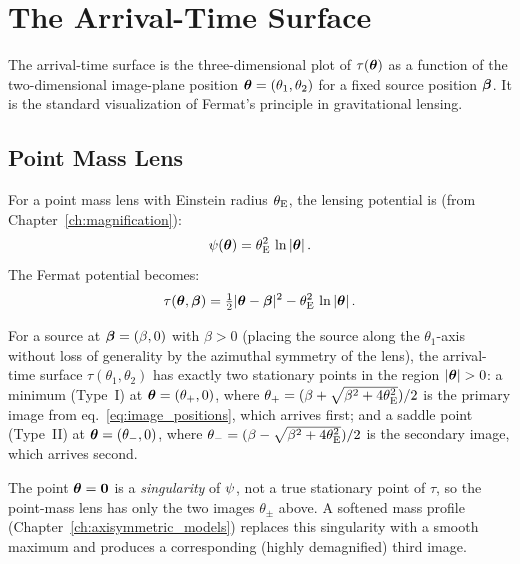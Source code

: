\section{The Arrival-Time Surface}
\label{sec:arrival_time_surface}

The arrival-time surface is the three-dimensional plot of
$\tau(\boldsymbol{\theta})$ as a function of the two-dimensional image-plane
position $\boldsymbol{\theta} = (\theta_1, \theta_2)$ for a fixed source position
$\boldsymbol{\beta}$.  It is the standard visualization of Fermat's principle in
gravitational lensing.

\subsection{Point Mass Lens}

For a point mass lens with Einstein radius $\theta_{\mathrm{E}}$, the lensing
potential is (from Chapter~\ref{ch:magnification}):
\begin{equation}
    \psi(\boldsymbol{\theta}) = \theta_{\mathrm{E}}^2\, \ln|\boldsymbol{\theta}| \,.
    \label{eq:psi_point_mass_fermat}
\end{equation}
The Fermat potential becomes:
\begin{equation}
    \tau(\boldsymbol{\theta}, \boldsymbol{\beta}) = \tfrac{1}{2}|\boldsymbol{\theta} - \boldsymbol{\beta}|^2
    - \theta_{\mathrm{E}}^2\, \ln|\boldsymbol{\theta}| \,.
    \label{eq:tau_point_mass}
\end{equation}

For a source at $\boldsymbol{\beta} = (\beta, 0)$ with $\beta > 0$ (placing the
source along the $\theta_1$-axis without loss of generality by the
azimuthal symmetry of the lens), the arrival-time surface
$\tau(\theta_1, \theta_2)$ has exactly two stationary points
in the region $|\boldsymbol{\theta}| > 0$: a minimum (Type~I) at
$\boldsymbol{\theta} = (\theta_+, 0)$, where
$\theta_+ = (\beta + \sqrt{\beta^2 + 4\theta_{\mathrm{E}}^2})/2$ is the primary image
from eq.~\eqref{eq:image_positions}, which arrives first; and a saddle
point (Type~II) at $\boldsymbol{\theta} = (\theta_-, 0)$, where
$\theta_- = (\beta - \sqrt{\beta^2 + 4\theta_{\mathrm{E}}^2})/2$ is the secondary
image, which arrives second.

The point $\boldsymbol{\theta} = \mathbf{0}$ is a \emph{singularity} of $\psi$,
not a true stationary point of $\tau$, so the point-mass lens has only
the two images $\theta_\pm$ above.  A softened mass profile
(Chapter~\ref{ch:axisymmetric_models}) replaces this singularity with a
smooth maximum and produces a corresponding (highly demagnified) third
image.

